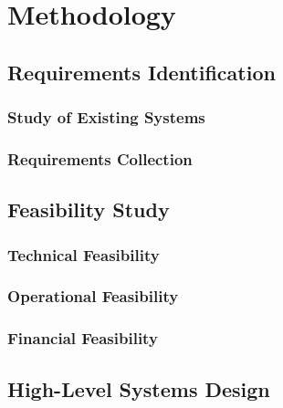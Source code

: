 \chapter{Methodology}

\section{Requirements Identification}

\subsection{Study of Existing Systems}

\subsection{Requirements Collection}

\section{Feasibility Study}

\subsection{Technical Feasibility}

\subsection{Operational Feasibility}

\subsection{Financial Feasibility}

\section{High-Level Systems Design}
